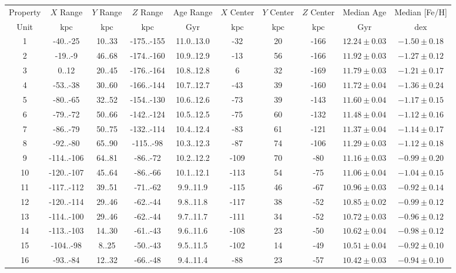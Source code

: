 \begin{tabular}{cccccccccc}
\hline \hline
Property & $X$ Range & $Y$ Range & $Z$ Range & Age Range & $X$ Center & $Y$ Center & $Z$ Center & Median Age & Median [Fe/H] \\
Unit & $\mathrm{kpc}$ & $\mathrm{kpc}$ & $\mathrm{kpc}$ & $\mathrm{Gyr}$ & $\mathrm{kpc}$ & $\mathrm{kpc}$ & $\mathrm{kpc}$ & $\mathrm{Gyr}$ & $\mathrm{dex}$ \\
\hline
1 & -40..-25 & 10..33 & -175..-155 & 11.0..13.0 & -32 & 20 & -166 & $12.24\pm0.03$ & $-1.50\pm0.18$ \\
2 & -19..-9 & 46..68 & -174..-160 & 10.9..12.9 & -13 & 56 & -166 & $11.92\pm0.03$ & $-1.27\pm0.12$ \\
3 & 0..12 & 20..45 & -176..-164 & 10.8..12.8 & 6 & 32 & -169 & $11.79\pm0.03$ & $-1.21\pm0.17$ \\
4 & -53..-38 & 30..60 & -166..-144 & 10.7..12.7 & -43 & 39 & -160 & $11.72\pm0.04$ & $-1.36\pm0.24$ \\
5 & -80..-65 & 32..52 & -154..-130 & 10.6..12.6 & -73 & 39 & -143 & $11.60\pm0.04$ & $-1.17\pm0.15$ \\
6 & -79..-72 & 50..66 & -142..-124 & 10.5..12.5 & -75 & 60 & -132 & $11.48\pm0.04$ & $-1.12\pm0.16$ \\
7 & -86..-79 & 50..75 & -132..-114 & 10.4..12.4 & -83 & 61 & -121 & $11.37\pm0.04$ & $-1.14\pm0.17$ \\
8 & -92..-80 & 65..90 & -115..-98 & 10.3..12.3 & -87 & 74 & -106 & $11.29\pm0.03$ & $-1.12\pm0.18$ \\
9 & -114..-106 & 64..81 & -86..-72 & 10.2..12.2 & -109 & 70 & -80 & $11.16\pm0.03$ & $-0.99\pm0.20$ \\
10 & -120..-107 & 45..64 & -86..-66 & 10.1..12.1 & -113 & 54 & -75 & $11.06\pm0.04$ & $-1.04\pm0.15$ \\
11 & -117..-112 & 39..51 & -71..-62 & 9.9..11.9 & -115 & 46 & -67 & $10.96\pm0.03$ & $-0.92\pm0.14$ \\
12 & -120..-114 & 29..46 & -62..-44 & 9.8..11.8 & -117 & 38 & -52 & $10.85\pm0.02$ & $-0.99\pm0.12$ \\
13 & -114..-100 & 29..46 & -62..-44 & 9.7..11.7 & -111 & 34 & -52 & $10.72\pm0.03$ & $-0.96\pm0.12$ \\
14 & -113..-103 & 14..30 & -61..-43 & 9.6..11.6 & -108 & 23 & -50 & $10.62\pm0.04$ & $-0.98\pm0.12$ \\
15 & -104..-98 & 8..25 & -50..-43 & 9.5..11.5 & -102 & 14 & -49 & $10.51\pm0.04$ & $-0.92\pm0.10$ \\
16 & -93..-84 & 12..32 & -66..-48 & 9.4..11.4 & -88 & 23 & -57 & $10.42\pm0.03$ & $-0.94\pm0.10$ \\

\end{tabular}
